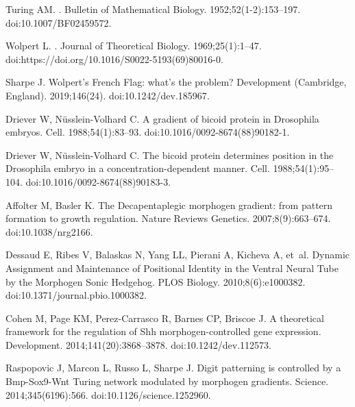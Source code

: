 \documentclass[10pt,letterpaper]{article}
\begin{document}
\begin{thebibliography}{10}

Turing AM.
.
\newblock Bulletin of Mathematical Biology. 1952;52(1-2):153--197.
\newblock doi:{10.1007/BF02459572}.

Wolpert L.
.
\newblock Journal of Theoretical Biology. 1969;25(1):1--47.
\newblock doi:{https://doi.org/10.1016/S0022-5193(69)80016-0}.

Sharpe J.
\newblock Wolpert's {French} {Flag}: what's the problem?
\newblock Development (Cambridge, England). 2019;146(24).
\newblock doi:{10.1242/dev.185967}.

Driever W, Nüsslein-Volhard C.
\newblock A gradient of bicoid protein in {Drosophila} embryos.
\newblock Cell. 1988;54(1):83--93.
\newblock doi:{10.1016/0092-8674(88)90182-1}.

Driever W, Nüsslein-Volhard C.
\newblock The bicoid protein determines position in the {Drosophila} embryo in
  a concentration-dependent manner.
\newblock Cell. 1988;54(1):95--104.
\newblock doi:{10.1016/0092-8674(88)90183-3}.

Affolter M, Basler K.
\newblock The {Decapentaplegic} morphogen gradient: from pattern formation to
  growth regulation.
\newblock Nature Reviews Genetics. 2007;8(9):663--674.
\newblock doi:{10.1038/nrg2166}.

Dessaud E, Ribes V, Balaskas N, Yang LL, Pierani A, Kicheva A, et~al.
\newblock Dynamic {Assignment} and {Maintenance} of {Positional} {Identity} in
  the {Ventral} {Neural} {Tube} by the {Morphogen} {Sonic} {Hedgehog}.
\newblock PLOS Biology. 2010;8(6):e1000382.
\newblock doi:{10.1371/journal.pbio.1000382}.

Cohen M, Page KM, Perez-Carrasco R, Barnes CP, Briscoe J.
\newblock A theoretical framework for the regulation of {Shh}
  morphogen-controlled gene expression.
\newblock Development. 2014;141(20):3868--3878.
\newblock doi:{10.1242/dev.112573}.

Raspopovic J, Marcon L, Russo L, Sharpe J.
\newblock Digit patterning is controlled by a {Bmp}-{Sox9}-{Wnt} {Turing}
  network modulated by morphogen gradients.
\newblock Science. 2014;345(6196):566.
\newblock doi:{10.1126/science.1252960}.


\end{thebibliography}
\end{document}
